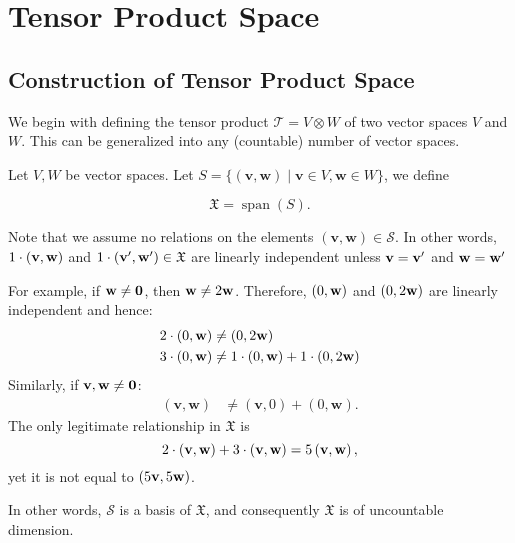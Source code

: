 \section{Tensor Product Space}

\subsection{Construction of Tensor Product Space}
We begin with defining the tensor product $\mathcal{T} = V \otimes W$ of two vector spaces $V$ and $W$. This can be generalized into any (countable) number of vector spaces.


\begin{definition} Let \(V,W\) be vector spaces. Let \(S = \{ \left( {\mathbf{v},\mathbf{w}}\right)  \mid  \mathbf{v} \in  V,\mathbf{w} \in  W\}\), we define

\[
\mathfrak{X} = \operatorname{span}\left( S\right).
\]
\end{definition}

\begin{remark}
    Note that we assume no relations on the elements \(\left( {\mathbf{v},\mathbf{w}}\right)  \in  \mathcal{S}\). In other words, $1\cdot ({\bf v}, {\bf w})$ and $1 \cdot ({\bf v}', {\bf w}') \in \mathfrak{X}$ are linearly independent unless ${\bf v} = {\bf v}'$ and ${\bf w} = {\bf w}'$ 
    
    For example, if ${\bf w} \neq {\bf 0}$, then ${\bf w} \neq 2{\bf w}$. Therefore, $(0,{\bf w})$ and $(0, 2{\bf w})$ are linearly independent and hence:
    \begin{align*} 
    2\cdot \left( {0,\mathbf{w}}\right)  &\neq  \left( {0,2\mathbf{w}}\right)\\
3\cdot \left( {0,\mathbf{w}}\right) &\neq 1\cdot \left( {0,\mathbf{w}}\right)  + 1\cdot\left( {0,{2\bf w}}\right)  \end{align*}
Similarly, if ${\bf v}, {\bf w} \neq {\bf 0}$:
\begin{align*}
\left(\mathbf{v},\mathbf{w}\right) &\neq \left( \mathbf{v},0\right)  +  \left( 0,\mathbf{w}\right). \end{align*}
The only legitimate relationship in $\mathfrak{X}$ is
\[
2\cdot \left( \mathbf{v},{\bf w}\right)  + 3\cdot \left(\mathbf{v},\mathbf{w}\right)  = 5\left( {\mathbf{v},\mathbf{w}}\right) ,
\]
yet it is not equal to $(5{\bf v},5{\bf w})$.

\noindent In other words, \(\mathcal{S}\) is a basis of \(\mathfrak{X}\), and consequently \(\mathfrak{X}\) is of uncountable dimension.
\end{remark}

